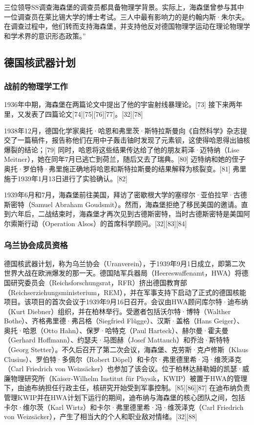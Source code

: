 三位领导SS调查海森堡的调查员都具备物理学背景。实际上，海森堡曾参与其中一位调查员在莱比锡大学的博士考试。三人中最有影响力的是约翰内斯·朱尔夫。在调查过程中，他们转而支持海森堡，并支持他反对德国物理学运动在理论物理学和学术界的意识形态政策。”
\subsection{德国核武器计划}    
\subsubsection{战前的物理学工作}  
1936年中期，海森堡在两篇论文中提出了他的宇宙射线暴理论。[73] 接下来两年里，又发表了四篇论文[74][75][76][77]。[32][78]

1938年12月，德国化学家奥托·哈恩和弗里茨·斯特拉斯曼向《自然科学》杂志提交了一篇稿件，报告称他们在用中子轰击铀时发现了元素钡，这使得哈恩得出铀核爆裂的结论；[79] 同时，哈恩将这些结果传达给了他的朋友莉泽·迈特纳（Lise Meitner），她在同年7月已逃亡到荷兰，随后又去了瑞典。[80] 迈特纳和她的侄子奥托·罗伯特·弗里施正确地将哈恩和斯特拉斯曼的结果解释为核裂变。[81] 弗里施于1939年1月13日进行了实验确认。[82]

1939年6月和7月，海森堡前往美国，拜访了密歇根大学的塞缪尔·亚伯拉罕·古德斯密特（Samuel Abraham Goudsmit）。然而，海森堡拒绝了移民美国的邀请。直到六年后，二战结束时，海森堡才再次见到古德斯密特，当时古德斯密特是美国阿尔索斯行动（Operation Alsos）的首席科学顾问。[32][83][84]
\subsubsection{乌兰协会成员资格}  
德国核武器计划，称为乌兰协会（Uranverein），于1939年9月1日成立，即第二次世界大战在欧洲爆发的那一天。德国陆军兵器局（Heereswaffenamt，HWA）将德国研究委员会（Reichsforschungsrat，RFR）挤出德国教育部（Reichserziehungsministerium，REM），并在军事支持下启动了正式的德国核能项目。该项目的首次会议于1939年9月16日召开。会议由HWA顾问库尔特·迪布纳（Kurt Diebner）组织，并在柏林举行。受邀者包括沃尔特·博特（Walther Bothe）、齐格弗里德·弗吕格（Siegfried Flügge）、汉斯·盖格（Hans Geiger）、奥托·哈恩（Otto Hahn）、保罗·哈特克（Paul Harteck）、赫尔曼·霍夫曼（Gerhard Hoffmann）、约瑟夫·马图赫（Josef Mattauch）和乔治·斯特特（Georg Stetter）。不久后召开了第二次会议，海森堡、克劳斯·克卢修斯（Klaus Clusius）、罗伯特·多佩尔（Robert Döpel）和卡尔·弗里德里希·冯·维茨泽克（Carl Friedrich von Weizsäcker）也参加了该会议。位于柏林达赫勒姆的凯瑟·威廉物理研究所（Kaiser-Wilhelm Institut für Physik，KWIP）被置于HWA的管理下，由迪布纳担任行政主任，核研究开始受到军事控制。[85][86][87] 在迪布纳负责管理KWIP并在HWA计划下运行的期间，迪布纳与海森堡的核心团队之间，包括卡尔·维尔茨（Karl Wirtz）和卡尔·弗里德里希·冯·维茨泽克（Carl Friedrich von Weizsäcker），产生了相当大的个人和职业敌对情绪。[32][88]

